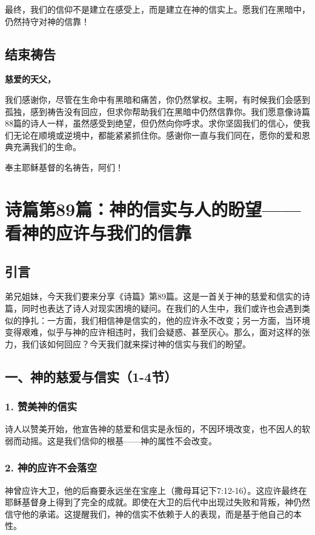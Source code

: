 \documentclass[a4paper, 12pt]{article}
\begin{document}
最终，我们的信仰不是建立在感受上，而是建立在神的信实上。愿我们在黑暗中，仍然持守对神的信靠！
\subsection*{结束祷告}
\textbf{慈爱的天父，}

我们感谢你，尽管在生命中有黑暗和痛苦，你仍然掌权。主啊，有时候我们会感到孤独，感到祷告没有回应，但求你帮助我们在黑暗中仍然信靠你。我们愿意像诗篇88篇的诗人一样，虽然感受到绝望，但仍然向你呼求。求你坚固我们的信心，使我们无论在顺境或逆境中，都能紧紧抓住你。感谢你一直与我们同在，愿你的爱和恩典充满我们的生命。

奉主耶稣基督的名祷告，阿们！
\newpage
\section{诗篇第89篇：神的信实与人的盼望——看神的应许与我们的信靠}
\subsection*{引言}
弟兄姐妹，今天我们要来分享《诗篇》第89篇。这是一首关于神的慈爱和信实的诗篇，同时也表达了诗人对现实困境的疑问。在我们的人生中，我们或许也会遇到类似的挣扎：一方面，我们相信神是信实的，他的应许永不改变；另一方面，当环境变得艰难，似乎与神的应许相违时，我们会疑惑、甚至灰心。那么，面对这样的张力，我们该如何回应？今天我们就来探讨神的信实与我们的盼望。

\subsection*{一、神的慈爱与信实（1-4节）}

\subsubsection*{1. 赞美神的信实}
诗人以赞美开始，他宣告神的慈爱和信实是永恒的，不因环境改变，也不因人的软弱而动摇。这是我们信仰的根基——神的属性不会改变。

\subsubsection*{2. 神的应许不会落空}
神曾应许大卫，他的后裔要永远坐在宝座上（撒母耳记下7:12-16）。这应许最终在耶稣基督身上得到了完全的成就。即使在大卫的后代中出现过失败和背叛，神仍然信守他的承诺。这提醒我们，神的信实不依赖于人的表现，而是基于他自己的本性。
\end{document}
